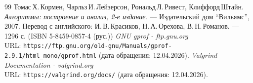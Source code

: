 \begin{thebibliography}{99}
Томас\,Х.\,Кормен, Чарльз\,И.\,Лейзерсон, Рональд\,Л.\,Ривест, Клиффорд\,Штайн.
{\itshape Алгоритмы: построение и анализ, 2-е издание.} --- Издательский дом \enquote{Вильямс}, 2007. Перевод с английского: И.\,В.\,Красиков, Н.\,А.\,Орехова, В.\,Н.\,Романов. --- 1296 с. (ISBN 5-8459-0857-4 (рус.))
{\itshape GNU gprof - ftp.gnu.org} \\
URL: \texttt{https://ftp.gnu.org/old-gnu/Manuals/gprof-2.9.1/html\_mono/gprof.html} (дата обращения: 12.04.2026).
{\itshape Valgrind Documentation - valgrind.org} \\
URL: \texttt{https://valgrind.org/docs/} (дата обращения: 12.04.2026).
\end{thebibliography}
\pagebreak

